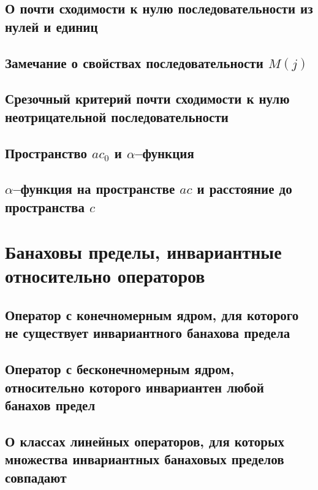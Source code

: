 \documentclass[a4paper,openbib]{report}
\theoremstyle{definition}
\begin{document}
	\section{О почти сходимости к нулю последовательности из нулей и единиц}
	

	\section{Замечание о свойствах последовательности $M(j)$}
	

	\section{Срезочный критерий почти сходимости к нулю неотрицательной последовательности}
	

	\section{Пространство $ac_0$ и $\alpha$--функция}
	

	\section{$\alpha$--функция на пространстве $ac$ и расстояние до пространства $c$}
	

\chapter{Банаховы пределы, инвариантные относительно операторов}

	\section{Оператор с конечномерным ядром, для которого не существует инвариантного банахова предела}
	

	\section{Оператор с бесконечномерным ядром, относительно которого инвариантен любой банахов предел}
	

	\section{О классах линейных операторов, для которых множества инвариантных банаховых пределов совпадают}
	
\end{document}
